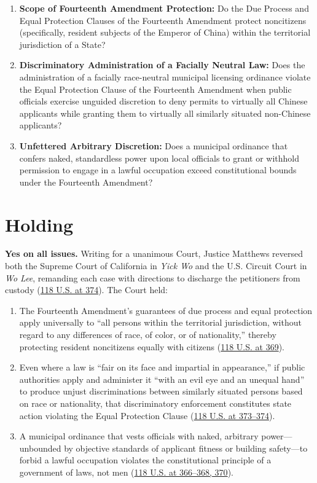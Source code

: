 \documentclass[12pt]{article}
\begin{document}
\begin{enumerate}
    \item \textbf{Scope of Fourteenth Amendment Protection:} Do the Due Process and Equal Protection Clauses of the Fourteenth Amendment protect noncitizens (specifically, resident subjects of the Emperor of China) within the territorial jurisdiction of a State?
    \item \textbf{Discriminatory Administration of a Facially Neutral Law:} Does the administration of a facially race-neutral municipal licensing ordinance violate the Equal Protection Clause of the Fourteenth Amendment when public officials exercise unguided discretion to deny permits to virtually all Chinese applicants while granting them to virtually all similarly situated non-Chinese applicants?
    \item \textbf{Unfettered Arbitrary Discretion:} Does a municipal ordinance that confers naked, standardless power upon local officials to grant or withhold permission to engage in a lawful occupation exceed constitutional bounds under the Fourteenth Amendment?
\end{enumerate}

\section{Holding}

\textbf{Yes on all issues.} Writing for a unanimous Court, Justice Matthews reversed both the Supreme Court of California in \emph{Yick Wo} and the U.S. Circuit Court in \emph{Wo Lee}, remanding each case with directions to discharge the petitioners from custody (\href{https://supreme.justia.com/cases/federal/us/118/356/}{118 U.S. at 374}). The Court held:
\begin{enumerate}
    \item The Fourteenth Amendment's guarantees of due process and equal protection apply universally to ``all persons within the territorial jurisdiction, without regard to any differences of race, of color, or of nationality,'' thereby protecting resident noncitizens equally with citizens (\href{https://supreme.justia.com/cases/federal/us/118/356/}{118 U.S. at 369}).
    \item Even where a law is ``fair on its face and impartial in appearance,'' if public authorities apply and administer it ``with an evil eye and an unequal hand'' to produce unjust discriminations between similarly situated persons based on race or nationality, that discriminatory enforcement constitutes state action violating the Equal Protection Clause (\href{https://supreme.justia.com/cases/federal/us/118/356/}{118 U.S. at 373--374}).
    \item A municipal ordinance that vests officials with naked, arbitrary power---unbounded by objective standards of applicant fitness or building safety---to forbid a lawful occupation violates the constitutional principle of a government of laws, not men (\href{https://supreme.justia.com/cases/federal/us/118/356/}{118 U.S. at 366--368, 370}).
\end{enumerate}
\end{document}
